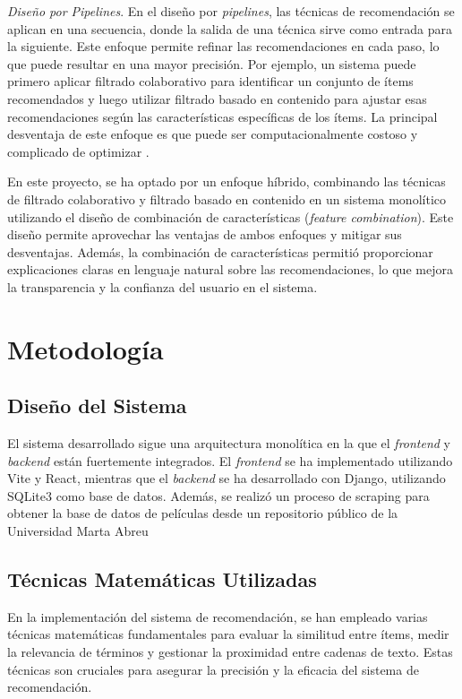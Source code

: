 \documentclass{llncs}
\begin{document}
	\textit{Diseño por Pipelines}.
	En el diseño por \textit{pipelines}, las técnicas de recomendación se aplican en una secuencia, donde la salida de una técnica sirve como entrada para la siguiente. Este enfoque permite refinar las recomendaciones en cada paso, lo que puede resultar en una mayor precisión. Por ejemplo, un sistema puede primero aplicar filtrado colaborativo para identificar un conjunto de ítems recomendados y luego utilizar filtrado basado en contenido para ajustar esas recomendaciones según las características específicas de los ítems. La principal desventaja de este enfoque es que puede ser computacionalmente costoso y complicado de optimizar \cite{jannach2010recommender}.
	
	En este proyecto, se ha optado por un enfoque híbrido, combinando las técnicas de filtrado colaborativo y filtrado basado en contenido en un sistema monolítico utilizando el diseño de combinación de características (\textit{feature combination}). Este diseño permite aprovechar las ventajas de ambos enfoques y mitigar sus desventajas. Además, la combinación de características permitió proporcionar explicaciones claras en lenguaje natural sobre las recomendaciones, lo que mejora la transparencia y la confianza del usuario en el sistema.
	
	
	
	\section{Metodología}
	\subsection{Diseño del Sistema}
	El sistema desarrollado sigue una arquitectura monolítica en la que el 	\textit{frontend} y 	\textit{backend} están fuertemente integrados. El 	\textit{frontend} se ha implementado utilizando Vite y React, mientras que el 	\textit{backend} se ha desarrollado con Django, utilizando SQLite3 como base de datos. Además, se realizó un proceso de scraping para obtener la base de datos de películas desde un repositorio público de la Universidad Marta Abreu\cite{uclv}
	
	\subsection{Técnicas Matemáticas Utilizadas}
	En la implementación del sistema de recomendación, se han empleado varias técnicas matemáticas fundamentales para evaluar la similitud entre ítems, medir la relevancia de términos y gestionar la proximidad entre cadenas de texto. Estas técnicas son cruciales para asegurar la precisión y la eficacia del sistema de recomendación.
	
\end{document}
